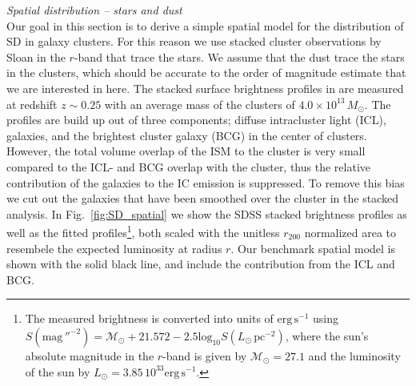 \documentclass[10pt,aps,pra,reprint,amsmath,amsfonts,amssymb,showpacs]{revtex4-1}
\newcommand{\rmn}{\mathrm}
\newcommand{\msun}{M_\odot}
\newcommand{\rvir}{r_{200}}
\begin{document}
{\it Spatial distribution -- stars and dust}\\ Our goal in this
section is to derive a simple spatial model for the distribution of SD
in galaxy clusters. For this reason we use stacked cluster
observations by Sloan in the $r$-band that trace the stars. We assume
that the dust trace the stars in the clusters, which should be
accurate to the order of magnitude estimate that we are interested in
here. The stacked surface brightness profiles in
\cite{2005MNRAS.358..949Z} are measured at redshift $z \sim 0.25$ with
an average mass of the clusters of $4.0\times10^{13}\,\msun$. The
profiles are build up out of three components; diffuse intracluster
light (ICL), galaxies, and the brightest cluster galaxy (BCG) in the
center of clusters. However, the total volume overlap of the ISM to
the cluster is very small compared to the ICL- and BCG overlap with
the cluster, thus the relative contribution of the galaxies to the IC
emission is suppressed. To remove this bias we cut out the galaxies
that have been smoothed over the cluster in the stacked analysis. In
Fig.~\ref{fig:SD_spatial} we show the SDSS stacked brightness profiles
as well as the fitted profiles\footnote{The measured brightness is
  converted into units of $\rmn{erg}\,\rmn{s}^{-1}$ using
  \cite{2010...book} $S(\rmn{mag}\,''^{-2}) =
  \mathcal{M}_\odot+21.572-2.5\rmn{log}_{10}S(L_\odot\,\rmn{pc}^{-2})$,
  where the sun's absolute magnitude in the $r$-band is given by
  $\mathcal{M}_\odot=27.1$ \cite{2000asqu.book..339L} and the
  luminosity of the sun by $L_\odot=3.85\,10^{33}
  \rmn{erg}\,\rmn{s}^{-1}$.}, both scaled with the unitless $\rvir$
normalized area to resembele the expected luminosity at radius
$r$. Our benchmark spatial model is shown with the solid black line,
and include the contribution from the ICL and BCG.
\end{document}
